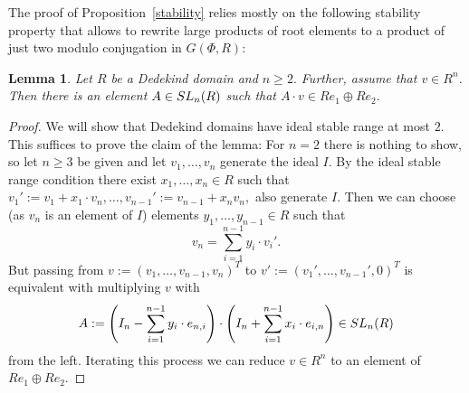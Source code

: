 \documentclass[12pt]{amsart}
\newtheorem{lemma}[theorem]{Lemma}
\theoremstyle{definition}\newtheorem{definition}[theorem]{Definition}
\theoremstyle{remark}\newtheorem{remark}[theorem]{Remark}
\theoremstyle{definition}\newtheorem{case}{Case}
\begin{document}
The proof of Proposition~\ref{stability} relies mostly on the following stability property that allows to rewrite large products of root elements to a product of just two modulo conjugation in $G(\Phi,R)$:

\begin{lemma}\label{stability_relative_ideal}
Let $R$ be a Dedekind domain and $n\geq 2.$ Further, assume that $v\in R^n$. Then there is an element $A\in{\rm SL}_n(R)$ such that $A\cdot v\in Re_1\oplus Re_2.$
\end{lemma}

\begin{proof}
We will show that Dedekind domains have ideal stable range at most $2$. This suffices to prove the claim of the lemma: For $n=2$ there is nothing to show, so let $n\geq 3$ be given and let $v_1,\dots,v_n$ generate the ideal $I$. By the ideal stable range condition there exist $x_1,\dots,x_n\in R$ such that $v_1':=v_1+x_1\cdot v_n,\dots,v_{n-1}':=v_{n-1}+x_nv_n,$ also generate $I$. Then we can choose (as $v_n$ is an element of $I$) elements $y_1,\dots,y_{n-1}\in R$ such that 
$$
v_n=\sum_{i=1}^{n-1} y_i\cdot v_i'.
$$
But passing from $v:=(v_1,\dots,v_{n-1},v_n)^T$ to $v':=(v_1',\dots,v_{n-1}',0)^T$ is equivalent with multiplying $v$ with 
$$
A:=\left(I_n-\sum_{i=1}^{n-1} y_i\cdot e_{n,i}\right)\cdot\left(I_n+\sum_{i=1}^{n-1}x_i\cdot e_{i,n}\right)\in{\rm SL}_n(R)
$$ 
from the left. Iterating this process we can reduce $v\in R^n$ to an element of $Re_1\oplus Re_2.$


\end{proof}
\end{document}
